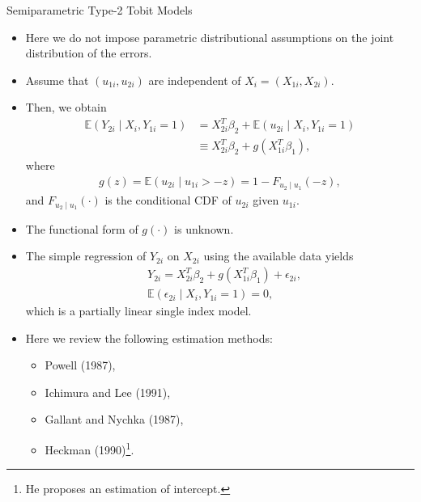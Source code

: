 \documentclass[xcolor=svgnames,dvipdfmx,cjk]{beamer}
\theoremstyle{example}
\def\E{\mathbb{E}}
\begin{document}
\begin{frame}{Semiparametric Type-2 Tobit Models}
      \begin{itemize}
            \item Here we do not impose parametric distributional assumptions on the joint distribution of the errors.
            \item Assume that $(u_{1i}, u_{2i})$ are independent of $X_i = (X_{1i}, X_{2i})$.
            \item Then, we obtain 
                  \begin{align*}
                        \E(Y_{2i} \mid X_i, Y_{1i}=1) 
                              &= X_{2i}^T \beta_2 + \E(u_{2i} \mid X_i, Y_{1i}=1)\\
                              &\equiv X_{2i}^T \beta_2 + g(X_{1i}^T\beta_1),
                  \end{align*}
                  where
                  \begin{align*}
                        g(z) = \E(u_{2i} \mid u_{1i}>-z) = 1 - F_{u_2 \mid u_1}(-z),
                  \end{align*}
                  and 
                  $F_{u_2 \mid u_1}(\cdot)$ is the conditional CDF of $u_{2i}$ given $u_{1i}$.    
            \item The functional form of $g(\cdot)$ is unknown.
      \end{itemize}
\end{frame}

\begin{frame}
      \begin{itemize}
            \item The simple regression of $Y_{2i}$ on $X_{2i}$ using the available data yields
                  \begin{align*}
                        & Y_{2i} = X_{2i}^T \beta_2 + g(X_{1i}^T \beta_1) + \epsilon_{2i},\\
                        & \E(\epsilon_{2i} \mid X_i, Y_{1i}=1) = 0,
                  \end{align*}
                  which is a partially linear single index model.
            \item Here we review the following estimation methods:
                  \begin{itemize}
                        \item Powell (1987),
                        \item Ichimura and Lee (1991),
                        \item Gallant and Nychka (1987),
                        \item Heckman (1990)\footnote{He proposes an estimation of intercept.}.
                  \end{itemize} 
      \end{itemize}
\end{frame}
\end{document}
